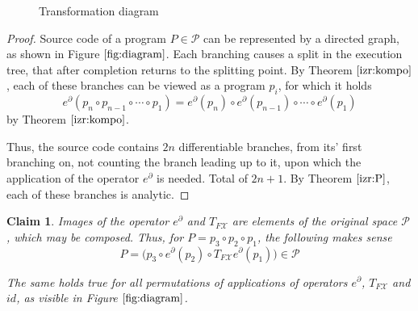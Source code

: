 \documentclass[smallcondensed]{svjour3}
\newcommand{\X}{\mathcal{X}}
\newcommand{\dP}{\mathcal{P}}
\newcommand{\D}{\partial}
\newtheorem{trditev}{Claim}[section]
\begin{document}
\begin{wrapfigure}{}{0.5\textwidth}
\caption{Transformation diagram} \label{fig:diagram} 
\vspace{-1.2cm}
\end{wrapfigure}






\begin{proof}
	Source code of a program $P\in\dP$ can be represented by a directed graph, as shown in Figure $\ref{fig:diagram}$. Each branching causes a split in the execution tree, that after completion returns to the splitting point.
	By Theorem $\ref{izr:kompo}$, each of these branches can be viewed as a program $p_i$, for which it holds $$e^\D(p_n\circ p_{n-1}\circ\cdots\circ p_1)=e^\D(p_n)\circ e^\D(p_{n-1})\circ\cdots\circ e^\D(p_1)$$ by Theorem $\ref{izr:kompo}$.
	
	Thus, the source code contains $2n$ differentiable branches, from its' first branching on, not counting the branch leading up to it, upon which the application of the operator $e^\D$ is needed. Total of $2n+1$. By Theorem $\ref{izr:P}$, each of these branches is analytic.
\end{proof}


\begin{trditev}\label{trd:composeOperators}
Images of the operator $e^\D$ and $T_{F\X}$  are elements of the original space $\dP$, which may be composed. Thus, for $P=p_3\circ p_2\circ p_1$, the following makes sense
\begin{equation}
P=\Big(p_3\circ e^ \D(p_2)\circ T_{F\X}e^\D(p_1)\Big) \in \dP
\end{equation}

The same holds true for all permutations of applications of operators $e^\D$, $T_{F\X}$ and $id$, as visible in Figure $\ref{fig:diagram}$.
\end{trditev}
\end{document}
